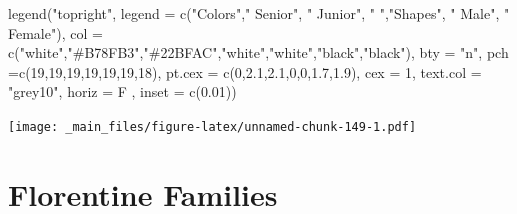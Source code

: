 \documentclass[
  notitlepage,
  onecolumn,
  openany]{book}
\newenvironment{Shaded}{\begin{snugshade}}{\end{snugshade}}
\newcommand{\AttributeTok}[1]{\textcolor[rgb]{0.77,0.63,0.00}{#1}}
\newcommand{\DecValTok}[1]{\textcolor[rgb]{0.00,0.00,0.81}{#1}}
\newcommand{\FloatTok}[1]{\textcolor[rgb]{0.00,0.00,0.81}{#1}}
\newcommand{\FunctionTok}[1]{\textcolor[rgb]{0.00,0.00,0.00}{#1}}
\newcommand{\NormalTok}[1]{#1}
\newcommand{\StringTok}[1]{\textcolor[rgb]{0.31,0.60,0.02}{#1}}
\begin{document}
\begin{Shaded}
\begin{Highlighting}[]
\FunctionTok{legend}\NormalTok{(}\StringTok{"topright"}\NormalTok{,}
       \AttributeTok{legend =} \FunctionTok{c}\NormalTok{(}\StringTok{"Colors"}\NormalTok{,}\StringTok{" Senior"}\NormalTok{, }\StringTok{" Junior"}\NormalTok{, }\StringTok{" "}\NormalTok{,}\StringTok{"Shapes"}\NormalTok{, }\StringTok{" Male"}\NormalTok{, }\StringTok{" Female"}\NormalTok{),}
       \AttributeTok{col =} \FunctionTok{c}\NormalTok{(}\StringTok{"white"}\NormalTok{,}\StringTok{"\#B78FB3"}\NormalTok{,}\StringTok{"\#22BFAC"}\NormalTok{,}\StringTok{"white"}\NormalTok{,}\StringTok{"white"}\NormalTok{,}\StringTok{"black"}\NormalTok{,}\StringTok{"black"}\NormalTok{), }
       \AttributeTok{bty =} \StringTok{"n"}\NormalTok{, }
       \AttributeTok{pch =}\FunctionTok{c}\NormalTok{(}\DecValTok{19}\NormalTok{,}\DecValTok{19}\NormalTok{,}\DecValTok{19}\NormalTok{,}\DecValTok{19}\NormalTok{,}\DecValTok{19}\NormalTok{,}\DecValTok{19}\NormalTok{,}\DecValTok{18}\NormalTok{),}
       \AttributeTok{pt.cex =} \FunctionTok{c}\NormalTok{(}\DecValTok{0}\NormalTok{,}\FloatTok{2.1}\NormalTok{,}\FloatTok{2.1}\NormalTok{,}\DecValTok{0}\NormalTok{,}\DecValTok{0}\NormalTok{,}\FloatTok{1.7}\NormalTok{,}\FloatTok{1.9}\NormalTok{), }
       \AttributeTok{cex =} \DecValTok{1}\NormalTok{, }
       \AttributeTok{text.col =} \StringTok{"grey10"}\NormalTok{, }
       \AttributeTok{horiz =}\NormalTok{ F , }
       \AttributeTok{inset =} \FunctionTok{c}\NormalTok{(}\FloatTok{0.01}\NormalTok{))}
\end{Highlighting}
\end{Shaded}

\texttt{[image: \_main\_files/figure-latex/unnamed-chunk-149-1.pdf]}

\hypertarget{florentine-families}{%
\section{Florentine Families}\label{florentine-families}}
\end{document}
